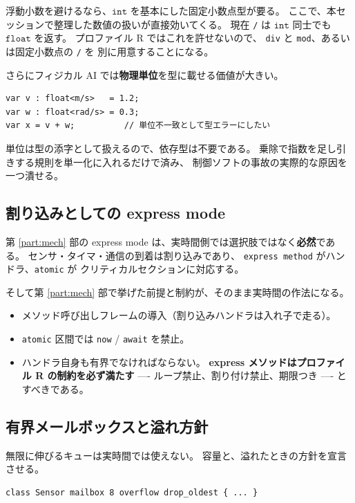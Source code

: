 \documentclass[11pt,a4paper]{ltjsarticle}
\theoremstyle{remark}
\newcommand{\ty}[1]{\ensuremath{\mathtt{#1}}}
\begin{document}
浮動小数を避けるなら、\ty{int} を基本にした固定小数点型が要る。
ここで、本セッションで整理した数値の扱いが直接効いてくる。
現在 \texttt{/} は \ty{int} 同士でも \ty{float} を返す。
プロファイル R ではこれを許せないので、
\texttt{div} と \texttt{mod}、あるいは固定小数点の \texttt{/} を
別に用意することになる。

さらにフィジカル AI では\textbf{物理単位}を型に載せる価値が大きい。

\begin{lstlisting}[language=AIPL]
var v : float<m/s>   = 1.2;
var w : float<rad/s> = 0.3;
var x = v + w;          // 単位不一致として型エラーにしたい
\end{lstlisting}

単位は型の添字として扱えるので、依存型は不要である。
乗除で指数を足し引きする規則を単一化に入れるだけで済み、
制御ソフトの事故の実際的な原因を一つ潰せる。

\subsection{割り込みとしての express mode}

第 \ref{part:mech} 部の express mode は、実時間側では選択肢ではなく\textbf{必然}である。
センサ・タイマ・通信の到着は割り込みであり、
\texttt{express method} がハンドラ、\texttt{atomic} が
クリティカルセクションに対応する。

そして第 \ref{part:mech} 部で挙げた前提と制約が、そのまま実時間の作法になる。

\begin{itemize}
\item メソッド呼び出しフレームの導入（割り込みハンドラは入れ子で走る）。
\item \texttt{atomic} 区間では \texttt{now} / \texttt{await} を禁止。
\item ハンドラ自身も有界でなければならない。
  \textbf{express メソッドはプロファイル R の制約を必ず満たす}
  ---- ループ禁止、割り付け禁止、期限つき ---- とすべきである。
\end{itemize}

\subsection{有界メールボックスと溢れ方針}

無限に伸びるキューは実時間では使えない。
容量と、溢れたときの方針を宣言させる。

\begin{lstlisting}[language=AIPL]
class Sensor mailbox 8 overflow drop_oldest { ... }
\end{lstlisting}
\end{document}
